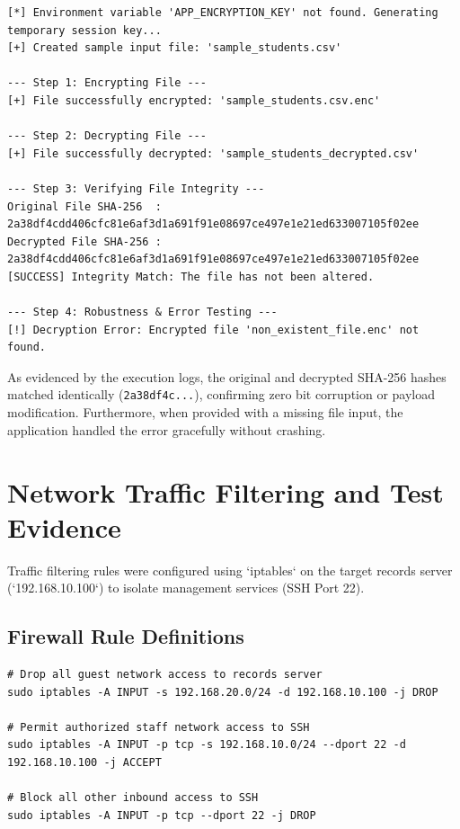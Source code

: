 \documentclass[11pt,a4paper]{article}
\begin{document}
\begin{lstlisting}[caption={Cryptographic Toolkit Execution Output Log}]
[*] Environment variable 'APP_ENCRYPTION_KEY' not found. Generating temporary session key...
[+] Created sample input file: 'sample_students.csv'

--- Step 1: Encrypting File ---
[+] File successfully encrypted: 'sample_students.csv.enc'

--- Step 2: Decrypting File ---
[+] File successfully decrypted: 'sample_students_decrypted.csv'

--- Step 3: Verifying File Integrity ---
Original File SHA-256  : 2a38df4cdd406cfc81e6af3d1a691f91e08697ce497e1e21ed633007105f02ee
Decrypted File SHA-256 : 2a38df4cdd406cfc81e6af3d1a691f91e08697ce497e1e21ed633007105f02ee
[SUCCESS] Integrity Match: The file has not been altered.

--- Step 4: Robustness & Error Testing ---
[!] Decryption Error: Encrypted file 'non_existent_file.enc' not found.
\end{lstlisting}

As evidenced by the execution logs, the original and decrypted SHA-256 hashes matched identically (\texttt{2a38df4c...}), confirming zero bit corruption or payload modification. Furthermore, when provided with a missing file input, the application handled the error gracefully without crashing.

\section{Network Traffic Filtering and Test Evidence}
Traffic filtering rules were configured using `iptables` on the target records server (`192.168.10.100`) to isolate management services (SSH Port 22).

\subsection{Firewall Rule Definitions}
\begin{lstlisting}[caption={Applied IPTables Rules}]
# Drop all guest network access to records server
sudo iptables -A INPUT -s 192.168.20.0/24 -d 192.168.10.100 -j DROP

# Permit authorized staff network access to SSH
sudo iptables -A INPUT -p tcp -s 192.168.10.0/24 --dport 22 -d 192.168.10.100 -j ACCEPT

# Block all other inbound access to SSH
sudo iptables -A INPUT -p tcp --dport 22 -j DROP
\end{lstlisting}
\end{document}
